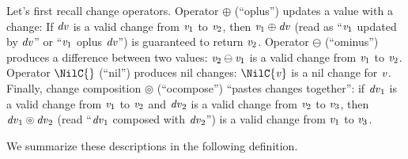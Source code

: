 Let's first recall change operators.
Operator \ensuremath{\oplus } (``oplus'') updates a value with a change: If \ensuremath{\Varid{dv}} is a
valid change from \ensuremath{\Varid{v}_{1}} to \ensuremath{\Varid{v}_{2}}, then \ensuremath{\Varid{v}_{1}\oplus \Varid{dv}} (read as
``\ensuremath{\Varid{v}_{1}} updated by \ensuremath{\Varid{dv}}'' or ``\ensuremath{\Varid{v}_{1}} oplus \ensuremath{\Varid{dv}}'') is guaranteed to
return \ensuremath{\Varid{v}_{2}}.
Operator \ensuremath{\ominus } (``ominus'') produces a difference between two values: \ensuremath{\Varid{v}_{2}\ominus \Varid{v}_{1}} is a valid change from \ensuremath{\Varid{v}_{1}} to \ensuremath{\Varid{v}_{2}}.
Operator \ensuremath{\NilC{}} (``nil'') produces nil changes: \ensuremath{\NilC{\Varid{v}}} is a nil
change for \ensuremath{\Varid{v}}.
Finally, change composition \ensuremath{\circledcirc } (``ocompose'') ``pastes
changes together'': if \ensuremath{\Varid{dv}_{1}} is a valid change from \ensuremath{\Varid{v}_{1}} to \ensuremath{\Varid{v}_{2}}
and \ensuremath{\Varid{dv}_{2}} is a valid change from \ensuremath{\Varid{v}_{2}} to \ensuremath{\Varid{v}_{3}}, then \ensuremath{\Varid{dv}_{1}\circledcirc\Varid{dv}_{2}} (read ``\ensuremath{\Varid{dv}_{1}} composed with \ensuremath{\Varid{dv}_{2}}'') is a valid change from \ensuremath{\Varid{v}_{1}} to \ensuremath{\Varid{v}_{3}}.

We summarize these descriptions in the following definition.

